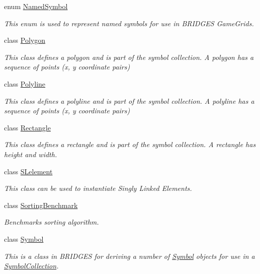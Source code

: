 \begin{DoxyCompactItemize}
enum \hyperlink{enumbridges_1_1base_1_1_named_symbol}{Named\+Symbol}
\begin{DoxyCompactList}\small\item\em This enum is used to represent named symbols for use in B\+R\+I\+D\+G\+ES Game\+Grids. \end{DoxyCompactList}\item 
class \hyperlink{classbridges_1_1base_1_1_polygon}{Polygon}
\begin{DoxyCompactList}\small\item\em This class defines a polygon and is part of the symbol collection. A polygon has a sequence of points (x, y coordinate pairs) \end{DoxyCompactList}\item 
class \hyperlink{classbridges_1_1base_1_1_polyline}{Polyline}
\begin{DoxyCompactList}\small\item\em This class defines a polyline and is part of the symbol collection. A polyline has a sequence of points (x, y coordinate pairs) \end{DoxyCompactList}\item 
class \hyperlink{classbridges_1_1base_1_1_rectangle}{Rectangle}
\begin{DoxyCompactList}\small\item\em This class defines a rectangle and is part of the symbol collection. A rectangle has height and width. \end{DoxyCompactList}\item 
class \hyperlink{classbridges_1_1base_1_1_s_lelement}{S\+Lelement}
\begin{DoxyCompactList}\small\item\em This class can be used to instantiate Singly Linked Elements. \end{DoxyCompactList}\item 
class \hyperlink{classbridges_1_1base_1_1_sorting_benchmark}{Sorting\+Benchmark}
\begin{DoxyCompactList}\small\item\em Benchmarks sorting algorithm. \end{DoxyCompactList}\item 
class \hyperlink{classbridges_1_1base_1_1_symbol}{Symbol}
\begin{DoxyCompactList}\small\item\em This is a class in B\+R\+I\+D\+G\+ES for deriving a number of \hyperlink{classbridges_1_1base_1_1_symbol}{Symbol} objects for use in a \hyperlink{classbridges_1_1base_1_1_symbol_collection}{Symbol\+Collection}. \end{DoxyCompactList}\item 

\end{DoxyCompactItemize}
